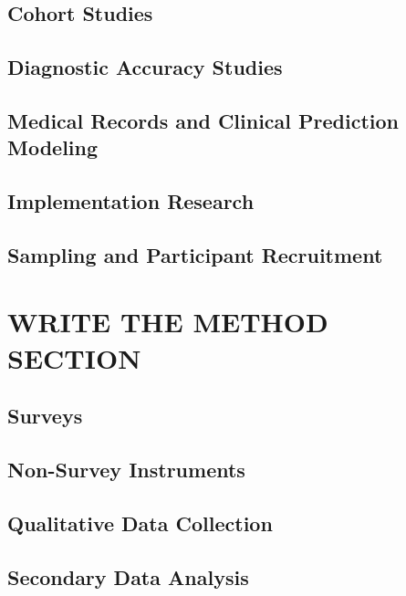\documentclass[justified,twoside,symmetric,]{tufte-book}
\begin{document}
\hypertarget{cohort}{%
\chapter{Cohort Studies}\label{cohort}}

\hypertarget{accuracy}{%
\chapter{Diagnostic Accuracy Studies}\label{accuracy}}

\hypertarget{prediction}{%
\chapter{Medical Records and Clinical Prediction Modeling}\label{prediction}}

\hypertarget{implementation}{%
\chapter{Implementation Research}\label{implementation}}

\hypertarget{sampling}{%
\chapter{Sampling and Participant Recruitment}\label{sampling}}

\hypertarget{part-write-the-method-section}{%
\part{WRITE THE METHOD SECTION}\label{part-write-the-method-section}}

\hypertarget{surveys}{%
\chapter{Surveys}\label{surveys}}

\hypertarget{nonsurvey}{%
\chapter{Non-Survey Instruments}\label{nonsurvey}}

\hypertarget{qualdata}{%
\chapter{Qualitative Data Collection}\label{qualdata}}

\hypertarget{secondary}{%
\chapter{Secondary Data Analysis}\label{secondary}}
\end{document}
